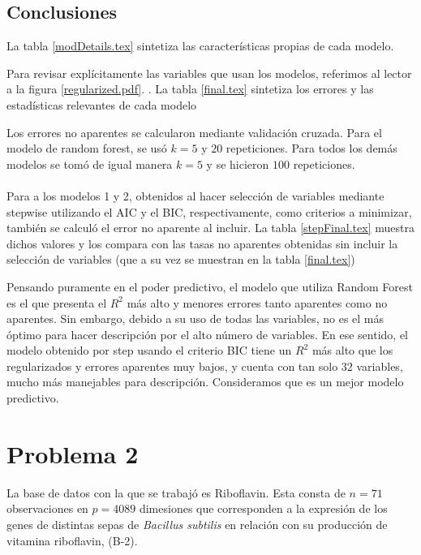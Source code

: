 \documentclass[11pt]{article}
\newcommand{\tablasimple}[2]{\begin{table}[H] \centering  \caption{#2} \label{#1} \end{table}}
\begin{document}
\subsection{Conclusiones}
La tabla \ref{modDetails.tex} sintetiza las características propias de cada modelo.
\tablasimple{modDetails.tex}{Detalles de cada modelo}
Para revisar explícitamente las variables que usan los modelos, referimos al lector a la figura \ref{regularized.pdf}. . La tabla \ref{final.tex} sintetiza los errores y las estadísticas relevantes de cada modelo
\tablasimple{final.tex}{Errores para cada modelo}
Los errores no aparentes se calcularon mediante validación cruzada. Para el modelo de random forest, se usó $k=5$ y $20$ repeticiones. Para todos los demás modelos se tomó de igual manera $k=5$ y se hicieron $100$ repeticiones. 
\\
\\Para a los modelos 1 y 2, obtenidos al hacer selección de variables mediante stepwise utilizando el AIC y el BIC, respectivamente, como criterios a minimizar, también se calculó el error no aparente al incluir. La tabla \ref{stepFinal.tex} muestra dichos valores y los compara con las tasas no aparentes obtenidas sin incluir la selección de variables (que a su vez se muestran en la tabla \ref{final.tex})
\tablasimple{stepFinal.tex}{Error cuadrático medio al incluir el proceso de selección en la validación. Debido a las limitaciones computacionales, para el error incluyendo el proceso de selección se realizaron $20$ iteraciones solamente }
Pensando puramente en el poder predictivo, el modelo que utiliza Random Forest es el que presenta el $R^2$ más alto y menores errores tanto aparentes como no aparentes. Sin embargo, debido a su uso de todas las variables, no es el más óptimo para hacer descripción por el alto número de variables. En ese sentido, el modelo obtenido por step usando el criterio BIC tiene un $R^2$ más alto que los regularizados y errores aparentes muy bajos, y cuenta con tan solo $32$ variables, mucho más manejables para descripción. Consideramos que es un mejor modelo predictivo.
\section{Problema 2}
La base de datos con la que se trabajó es Riboflavin. Esta consta de $n=71$ observaciones en $p=4089$ dimesiones que corresponden a la expresión de los genes de distintas sepas de \emph{Bacillus subtilis} en relación con su producción de vitamina riboflavin, (B-2). 
\end{document}
